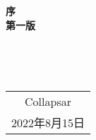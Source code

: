 \documentclass[openany,11pt]{book}
\begin{document}
\frontmatter

\tableofcontents

\mainmatter

\setcounter{page}{1}

\begin{center}
	\Huge\textbf{序}
	\\
   \LARGE\textbf{第一版}
\end{center}~\



~\\
\begin{flushright}
	\begin{tabular}{c}
		Collapsar\\
		2022年8月15日
	\end{tabular}
\end{flushright}








\end{document}
